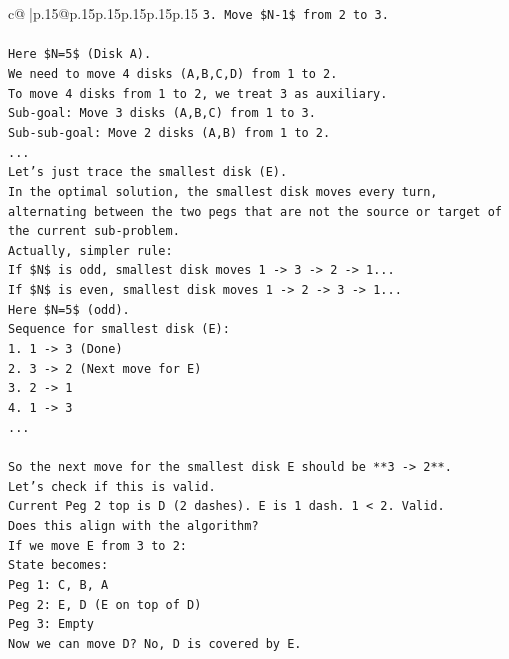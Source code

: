 \documentclass{article}
\begin{document}
{\begin{supertabular}{c@{$\;$}|p{.15\linewidth}@{}p{.15\linewidth}p{.15\linewidth}p{.15\linewidth}p{.15\linewidth}p{.15\linewidth}}
{{{\texttt{3. Move \$N{-}1\$ from 2 to 3.} \\
\\ 
\texttt{Here \$N=5\$ (Disk A).} \\
\texttt{We need to move 4 disks (A,B,C,D) from 1 to 2.} \\
\texttt{To move 4 disks from 1 to 2, we treat 3 as auxiliary.} \\
\texttt{Sub{-}goal: Move 3 disks (A,B,C) from 1 to 3.} \\
\texttt{Sub{-}sub{-}goal: Move 2 disks (A,B) from 1 to 2.} \\
\texttt{...} \\
\texttt{Let's just trace the smallest disk (E).} \\
\texttt{In the optimal solution, the smallest disk moves every turn, alternating between the two pegs that are not the source or target of the current sub{-}problem.} \\
\texttt{Actually, simpler rule:} \\
\texttt{If \$N\$ is odd, smallest disk moves 1 {-}> 3 {-}> 2 {-}> 1...} \\
\texttt{If \$N\$ is even, smallest disk moves 1 {-}> 2 {-}> 3 {-}> 1...} \\
\texttt{Here \$N=5\$ (odd).} \\
\texttt{Sequence for smallest disk (E):} \\
\texttt{1. 1 {-}> 3 (Done)} \\
\texttt{2. 3 {-}> 2 (Next move for E)} \\
\texttt{3. 2 {-}> 1} \\
\texttt{4. 1 {-}> 3} \\
\texttt{...} \\
\\ 
\texttt{So the next move for the smallest disk E should be **3 {-}> 2**.} \\
\texttt{Let's check if this is valid.} \\
\texttt{Current Peg 2 top is D (2 dashes). E is 1 dash. 1 < 2. Valid.} \\
\texttt{Does this align with the algorithm?} \\
\texttt{If we move E from 3 to 2:} \\
\texttt{State becomes:} \\
\texttt{Peg 1: C, B, A} \\
\texttt{Peg 2: E, D (E on top of D)} \\
\texttt{Peg 3: Empty} \\
\texttt{Now we can move D? No, D is covered by E.} \\
}}}
\end{supertabular}}
\end{document}
